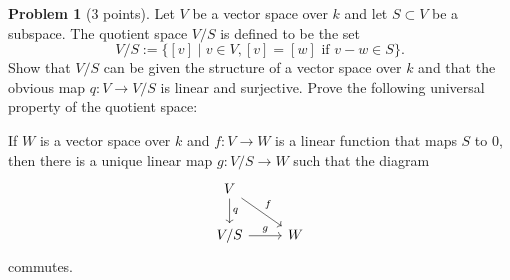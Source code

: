 \documentclass[11pt]{article}
\theoremstyle{definition}
\newtheorem{prob}{Problem}
\begin{document}
\begin{prob}[3 points]
Let $V$ be a vector space over $k$ and let $S \subset V$ be a subspace.
The quotient space $V / S$ is defined to be the set
\[
V / S := \{ [v] \mid v \in V, \text{$[v] = [w]$ if $v-w \in S$} \}.
\]
Show that $V/S$ can be given the structure of a vector space over $k$ and that
the obvious map $q : V \to V/S$ is linear and surjective.
Prove the following universal property of the quotient space:

If $W$ is a vector space over $k$ and $f : V \to W$ is a linear function that maps $S$ to $0$, then there is a unique linear map $g : V/S \to W$ such that the diagram
\[
\begin{tikzcd}
V \ar[d, "q"] \ar[dr, "f"]
\\
V/S \ar[r, "g"] & W
\end{tikzcd}
\]
commutes.
\end{prob}
\end{document}
